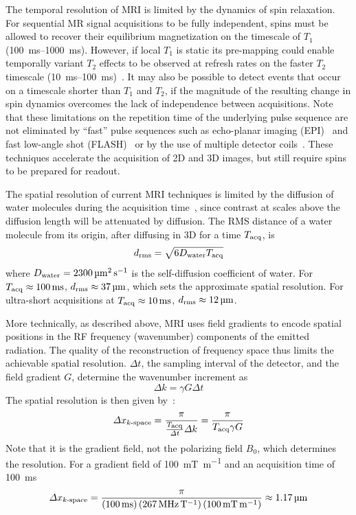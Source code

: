 The temporal resolution of MRI is limited by the dynamics of spin relaxation. For sequential MR signal acquisitions to be fully independent, spins must be allowed to recover their equilibrium magnetization on the timescale of $T_1$ (\SIrange{100}{1000}{\milli\second}).
However, if local $T_1$ is static its pre-mapping could enable temporally variant $T_2$ effects to be observed at refresh rates on the faster $T_2$ timescale (\SIrange{10}{100}{\milli\second})~\cite{deichmann95}.
It may also be possible to detect events that occur on a timescale shorter than $T_1$ and $T_2$, if the magnitude of the resulting change in spin dynamics overcomes the lack of independence between acquisitions.
Note that these limitations on the repetition time of the underlying pulse sequence are not eliminated by ``fast'' pulse sequences such as echo-planar imaging (EPI)~\cite{stehling91} and fast low-angle shot (FLASH)~\cite{haase86} or by the use of multiple detector coils~\cite{wiesinger06}.
These techniques accelerate the acquisition of 2D and 3D images, but still require spins to be prepared for readout.

The spatial resolution of current MRI techniques is limited by the diffusion of water molecules during the acquisition time~\cite{glover02}, since contrast at scales above the diffusion length will be attenuated by diffusion.
The RMS distance of a water molecule from its origin, after diffusing in 3D for a time $T_{\text{\scriptsize acq}}$, is
\[d_{\text{\scriptsize rms}} = \sqrt{6D_{\text{\scriptsize water}}T_{\text{\scriptsize acq}}}\]
where $D_{\text{\scriptsize water}}=\SI{2300}{\micro\meter\squared\per\second}$ is the self-diffusion coefficient of water.
For $T_{\text{\scriptsize acq}}\approx\SI{100}{\milli\second}$, $d_{\text{\scriptsize rms}}\approx\SI{37}{\micro\meter}$, which sets the approximate spatial resolution.
For ultra-short acquisitions at $T_{\text{\scriptsize acq}}\approx\SI{10}{\milli\second}$, $d_{\text{\scriptsize rms}}\approx\SI{12}{\micro\meter}$.

More technically, as described above, MRI uses field gradients to encode spatial positions in the RF frequency (wavenumber) components of the emitted radiation.
The quality of the reconstruction of frequency space thus limits the achievable spatial resolution.
$\Delta t$, the sampling interval of the detector, and the field gradient $G$, determine the wavenumber increment as
\[\Delta k = \gamma G \Delta t\]
The spatial resolution is then given by~\cite{glover02}:
\[\Delta x_{\text{\scriptsize $k$-space}} = \frac{\pi}{\frac{T_{\text{\scriptsize acq}}}{\Delta t} \Delta k} = \frac{\pi}{T_{\text{\scriptsize acq}} \gamma G}\]
Note that it is the gradient field, not the polarizing field $B_0$, which determines the resolution. For a gradient field of \SI{100}{\milli\tesla\per\meter} and an acquisition time of \SI{100}{\milli\second}
\[\Delta x\sub{$k$-space} = \frac{\pi}{\left(\SI{100}{\milli\second}\right)\left(\SI{267}{\MHz\per\tesla}\right)\left(\SI{100}{\milli\tesla\per\meter}\right)}\approx \SI{1.17}{\micro\meter}\]

